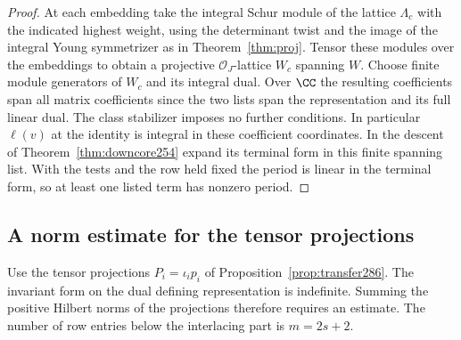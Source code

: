 \documentclass[a4paper,11pt]{article}
\theoremstyle{definition}
\theoremstyle{remark}
\numberwithin{equation}{section}
\begin{document}
\begin{proof}
At each embedding take the integral Schur module of the lattice
\(\Lambda_c\) with the indicated highest weight, using the
determinant twist and the image of the integral Young
symmetrizer as in Theorem~\ref{thm:proj}. Tensor these modules
over the embeddings to obtain a projective \(\mathcal O_J\)-lattice
\(W_c\) spanning \(W\). Choose finite module generators of
\(W_c\) and its integral dual. Over \(\CC\) the resulting
coefficients span all matrix coefficients since the two lists
span the representation and its full linear dual. The class
stabilizer imposes no further conditions. In particular
\(\ell(v)\) at the identity is integral in these coefficient
coordinates. In the descent of Theorem~\ref{thm:downcore254}
expand its terminal form in this finite spanning list. With
the tests and the row held fixed the period is linear in the
terminal form, so at least one listed term has nonzero period.
\end{proof}

\subsection{A norm estimate for the tensor projections}\label{nav:VI-51}
Use the tensor projections \(P_i=\iota_i p_i\) of
Proposition~\ref{prop:transfer286}. The invariant form on the
dual defining representation is indefinite. Summing the
positive Hilbert norms of the projections therefore requires
an estimate. The number of row entries below the interlacing
part is \(m=2s+2\).
\end{document}
